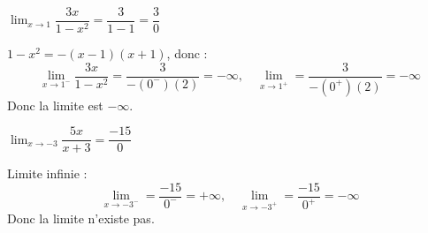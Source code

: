 {\begin{tasks}
  \task \( \displaystyle \lim_{x \to 1} \dfrac{3x}{1 - x^2}
  = \dfrac{3}{1 - 1} = \dfrac{3}{0} \)

  \( 1 - x^2 = -(x - 1)(x + 1) \), donc :
  \[
  \lim_{x \to 1^-} \dfrac{3x}{1 - x^2} = \dfrac{3}{-(0^-)(2)} = -\infty, \quad
  \lim_{x \to 1^+} = \dfrac{3}{-(0^+)(2)} = -\infty
  \]
  Donc la limite est \( -\infty \).

  \task \( \displaystyle \lim_{x \to -3} \dfrac{5x}{x + 3} = \dfrac{-15}{0} \)

  Limite infinie :
  \[
  \lim_{x \to -3^-} = \dfrac{-15}{0^-} = +\infty, \quad
  \lim_{x \to -3^+} = \dfrac{-15}{0^+} = -\infty
  \]
  Donc la limite n’existe pas.

\end{tasks}
}

